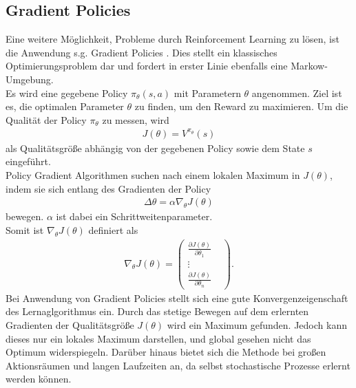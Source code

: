 	\subsection{Gradient Policies}
		Eine weitere Möglichkeit, Probleme durch Reinforcement Learning zu lösen, ist die Anwendung s.g. \grqq Gradient Policies \glqq{}. Dies stellt ein klassisches Optimierungsproblem dar und fordert in erster Linie ebenfalls eine Markow-Umgebung.\\
		Es wird eine gegebene Policy $\pi_\theta(s,a)$ mit Parametern $\theta$ angenommen. Ziel ist es, die optimalen Parameter $\theta$ zu finden, um den Reward zu maximieren. Um die Qualität der Policy $\pi_\theta$ zu messen, wird
		\begin{align}
			J(\theta) = V^{\pi_\theta}(s)
		\end{align}
		als Qualitätsgröße abhängig von der gegebenen Policy sowie dem State $s$ eingeführt.\\
		Policy Gradient Algorithmen suchen nach einem lokalen Maximum in $J(\theta)$, indem sie sich entlang des Gradienten der Policy 
		\begin{align}
			\Delta \theta = \alpha \nabla_\theta J(\theta)
		\end{align}
		bewegen. $\alpha$ ist dabei ein Schrittweitenparameter.\\
		Somit ist $\nabla_\theta J(\theta)$ definiert als
		\begin{align}
			\nabla_\theta J(\theta) = \begin{pmatrix}
			\frac{\partial J(\theta)}{\partial \theta_1} & \\
			\vdots & \\
			\frac{\partial J(\theta)}{\partial \theta_n} & \end{pmatrix}.
		\end{align}
		Bei Anwendung von Gradient Policies stellt sich eine gute Konvergenzeigenschaft des Lernaglgorithmus ein. Durch das stetige Bewegen auf dem erlernten Gradienten der Qualitätsgröße $J(\theta)$ wird ein Maximum gefunden. Jedoch kann dieses nur ein lokales Maximum darstellen, und global gesehen nicht das Optimum widerspiegeln. Darüber hinaus bietet sich die Methode bei großen Aktionsräumen und langen Laufzeiten an, da selbst stochastische Prozesse erlernt werden können. \cite{SilverRL} 
